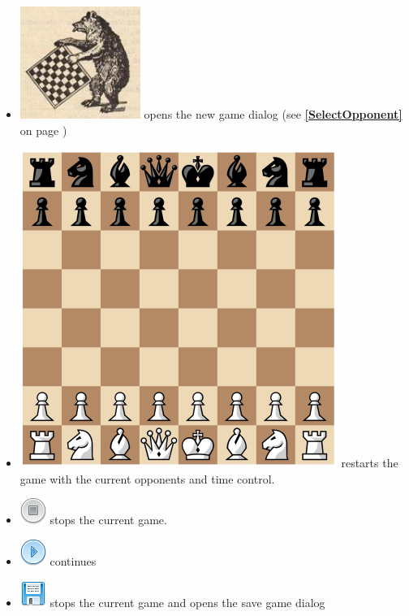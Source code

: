 \documentclass[11pt,a4paper]{article}
\begin{document}
\begin{itemize}
	\item \includegraphics[scale=0.2]{bearchess.png} opens the new game dialog (see \textbf{\ref{SelectOpponent}  } on page \pageref{SelectOpponent})
	\item \includegraphics[scale=0.1]{chessboard_base.png} restarts the game with the current opponents and time control.
    \item \includegraphics[scale=0.5]{control_stop.png} stops the current game.
    \item \includegraphics[scale=0.5]{control_play_blue.png} continues
    \item \includegraphics[scale=0.5]{diskette.png} stops the current game and opens the save game dialog
\end{itemize}
\end{document}
